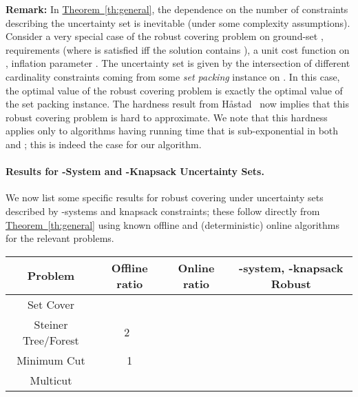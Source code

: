 \documentclass[11pt,letterpaper]{article}
\newcommand{\ignore}[1]{}
\newcommand{\lref}[2][]{\hyperref[#2]{#1~\ref*{#2}}}
\def\cov{\ensuremath{\Pi}\xspace}
\def\rcov{{\sf Robust(\cov)}\xspace}
\newcounter{note}[section]
\begin{document}
{\bf Remark:} In \lref[Theorem]{th:general}, the dependence on the number of constraints describing the uncertainty set
 is inevitable (under some complexity assumptions). Consider a very special case of the robust covering problem
on ground-set , requirements  (where  is satisfied iff the solution contains ), a unit cost function
on , inflation parameter . The uncertainty set   is given by the intersection of  different
cardinality constraints coming from some {\em set packing} instance on . In this case, the optimal value of the
robust covering problem is exactly the optimal value of the set packing instance. The hardness result from
H{\aa}stad~\cite{H99} now implies that this robust covering problem is  hard to
approximate. We note that this hardness applies only to algorithms having running time that is sub-exponential in both
 and ; this is indeed the case for our algorithm.

\ignore{{\bf Remark 2:} Instead of reducing all the knapsacks to a single partition matroid and losing a factor 
as above, we can reduce each knapsack to a partition matroid (using \lref[Lemma]{lem:knap-to-mat}). This only incurs an
 factor loss, however this reduction has running time . After this reduction, we are left with an
uncertainty set that is a -system for which the algorithm of \lref[Section]{subsec:framework-mat} applies. Thus
there is an  time -approximation algorithm for \rcov under
 matroid and  knapsack constraints. This reduction also implies a -approximation algorithm for
(monotone) submodular maximization subject to a -system and  knapsacks (when  is a constant)...}



\paragraph{Results for -System and -Knapsack Uncertainty Sets.} We now list some specific results for robust covering
under uncertainty sets described by -systems and knapsack constraints; these follow directly from
\lref[Theorem]{th:general} using known offline and (deterministic) online algorithms for the relevant problems.

\begin{center}
\begin{small}
\begin{tabular}{|c|c|c|c|} \hline
{\bf Problem} & {\bf Offline ratio }& {\bf Online ratio} & {\bf -system, -knapsack Robust}\\
\hline\hline
Set Cover &  & ~\cite{AAABN03} &  \\
\hline
Steiner Tree/Forest & 2~\cite{AKR95,GW95} & ~\cite{IM91,BC97} & \\
\hline Minimum Cut & 1 & ~\cite{AAABN04,HHR03} & \\
\hline Multicut & ~\cite{GVY96} & ~\cite{AAABN04,HHR03} & \\
\hline
\end{tabular}
\end{small}
\end{center}
\end{document}

